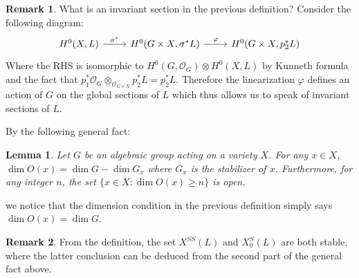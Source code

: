 \documentclass[12pt]{article}
\newtheorem{lemma}{Lemma}[section]
\theoremstyle{remark}
\theoremstyle{definition}
\newtheorem{remark}{Remark}[section]
\newcommand{\s}[0]{\sigma}
\begin{document}
    \begin{remark}
        What is an invariant section in the previous definition? Consider the following diagram:
        \[
            \begin{tikzcd}
                {H^0(X, L)} \arrow[r, "\s^*"] & {H^0(G\times X,\s^* L)} \arrow[r, "\varphi"] & {H^0(G\times X, p_2^*L)}
            \end{tikzcd}
        \]
        Where the RHS is isomorphic to $H^0(G, \mathcal O_G)\otimes H^0(X, L)$ by Kunneth formula and the fact that $p_1^*\mathcal O_G\otimes_{\mathcal O_{G\times X}}p_2^*L=p_2^*L$. Therefore the linearization $\varphi$ defines an action of $G$ on the global sections of $L$ which thus allows us to speak of invariant sections of $L$.
    \end{remark}
    By the following general fact:
    \begin{lemma}
        Let $G$ be an algebraic group acting on a variety $X$. For any $x\in X$, $\dim O(x)=\dim G-\dim G_x$ where $G_x$ is the stabilizer of $x$. Furthermore, for any integer $n$, the set $\{x\in X:\dim O(x)\geqslant n\}$ is open.
    \end{lemma}
    we notice that the dimension condition in the previous definition simply says $\dim O(x)=\dim G$.
    \begin{remark}
        From the definition, the set $X^{SS}(L)$ and $X_0^S(L)$ are both stable, where the latter conclusion can be deduced from the second part of the general fact above.
    \end{remark}
    
\end{document}
